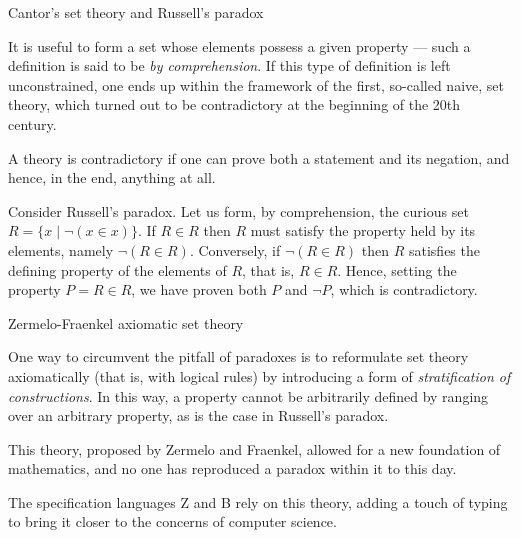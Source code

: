 \documentclass[compress,dvips,xcolor={dvipsnames},t]{beamer}
\begin{document}
%
\begin{frame}{Cantor's set theory and Russell's paradox}

It is useful to form a set whose elements possess a given
property --- such a definition is said to be \emph{by
  comprehension}. If this type of definition is left unconstrained,
one ends up within the framework of the first, so-called naive, set
theory, which turned out to be contradictory at the beginning of the
20th century.

\bigskip

A theory is contradictory if one can prove both a statement and its
negation, and hence, in the end, anything at all.

\bigskip

Consider Russell's paradox. Let us form, by comprehension, the
curious set $R = \{x \mid \neg(x \in x)\}$. If $R \in R$ then $R$
must satisfy the property held by its elements, namely $\neg(R \in
R)$. Conversely, if $\neg(R \in R)$ then $R$ satisfies the defining
property of the elements of $R$, that is, $R \in R$. Hence, setting
the property $P = R \in R$, we have proven both $P$ and $\neg{P}$,
which is contradictory.

\end{frame}

%
\begin{frame}{Zermelo-Fraenkel axiomatic set theory}

One way to circumvent the pitfall of paradoxes is to reformulate set
theory axiomatically (that is, with logical rules) by introducing a
form of \emph{stratification of constructions}. In this way, a
property cannot be arbitrarily defined by ranging over an arbitrary
property, as is the case in Russell's paradox.

\bigskip

This theory, proposed by Zermelo and Fraenkel, allowed for a
new foundation of mathematics, and no one has reproduced a paradox
within it to this day.

\bigskip

The specification languages \textsf{Z} and \textsf{B} rely on this
theory, adding a touch of typing to bring it closer to the concerns
of computer science.

\end{frame}
\end{document}
